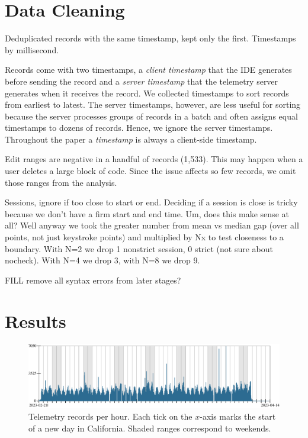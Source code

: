 \documentclass[english,submission,cleveref]{programming}
\begin{document}
\section{Data Cleaning}

Deduplicated records with the same timestamp,
kept only the first.
Timestamps by millisecond.

Records come with two timestamps, a \emph{client timestamp}
that the IDE generates before sending the record
and a \emph{server timestamp} that the telemetry server
generates when it receives the record.
We collected timestamps to sort records from earliest to latest.
The server timestamps, however, are less useful for sorting
because the server processes groups of records in a batch and
often assigns equal timestamps to dozens of records.
Hence, we ignore the server timestamps.
Throughout the paper a \emph{timestamp} is always a client-side timestamp.


Edit ranges are negative in a handful of records (1,533).
This may happen when a user deletes a large block of code.
Since the issue affects so few records, we omit those ranges
from the analysis.

Sessions, ignore if too close to start or end.
Deciding if a session is close is tricky because we don't have
a firm start and end time.
Um, does this make sense at all?
Well anyway we took the greater number from mean vs median
gap (over all points, not just keystroke points)
and multiplied by Nx to test closeness to a boundary.
With N=2 we drop 1 nonstrict session, 0 strict (not sure about nocheck).
With N=4 we drop 3, with N=8 we drop 9.

FILL remove all syntax errors from later stages?



\section{Results}
\label{s:data}

\begin{figure}[t]
  \includegraphics[width=\columnwidth]{img/row-distribution.pdf}
  \caption{Telemetry records per hour. Each tick on the $x$-axis marks the start of a new day in California. Shaded ranges correspond to weekends.}
  \label{f:records-per-hour}
\end{figure}
\end{document}
